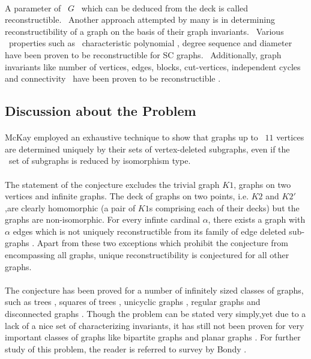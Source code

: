 \documentclass[12pt,conference]{IEEEtran}
\begin{document}
\paragraph*{} A parameter of  $G$  which can be deduced from the deck is called reconstructible.  Another approach attempted by many is in determining reconstructibility of a graph on the basis of their graph invariants.  Various  properties such as  characteristic polynomial \cite{e1}, degree sequence \cite{w1} and diameter \cite{s2} have been proven to be reconstructible for SC graphs.  Additionally, graph invariants like number of vertices, edges, blocks, cut-vertices, independent cycles and connectivity  have been proven to be reconstructible \cite{k2}. 

\subsection{ Discussion about the Problem }
\paragraph*{} McKay\cite{b1} employed an exhaustive technique to show that graphs up to  $11$ vertices are determined uniquely by their sets of vertex-deleted subgraphs, even if the   set of subgraphs is reduced by isomorphism type.  
\paragraph*{} The statement of the conjecture excludes the trivial graph $K1$, graphs on two vertices and infinite graphs. The deck of graphs on two points, i.e. $K2$ and $K2'$,are clearly homomorphic (a pair of $K1$s comprising each of their decks) but the graphs are non-isomorphic. For every infinte cardinal $\alpha$, there exists a graph with $\alpha$ edges which is not uniquely reconstructible from its family of edge deleted sub-graphs \cite{c1} .
Apart from these two exceptions which prohibit the conjecture from encompassing all graphs, unique reconstructibility is conjectured for all other graphs.
\paragraph*{} The conjecture has been proved for a number of infinitely sized classes of graphs, such as trees \cite{k1}, squares of trees \cite{s1}, unicyclic graphs \cite{m2}, regular graphs \cite{n2} and disconnected graphs \cite{h2}. Though the problem can be stated very simply,yet due to a lack of a nice set of characterizing invariants, it has still not been proven for very important classes of graphs like bipartite graphs \cite{b3} and planar graphs \cite{b3}. For further study of this problem, the reader is referred to survey by Bondy \cite{b3}. 
\end{document}
